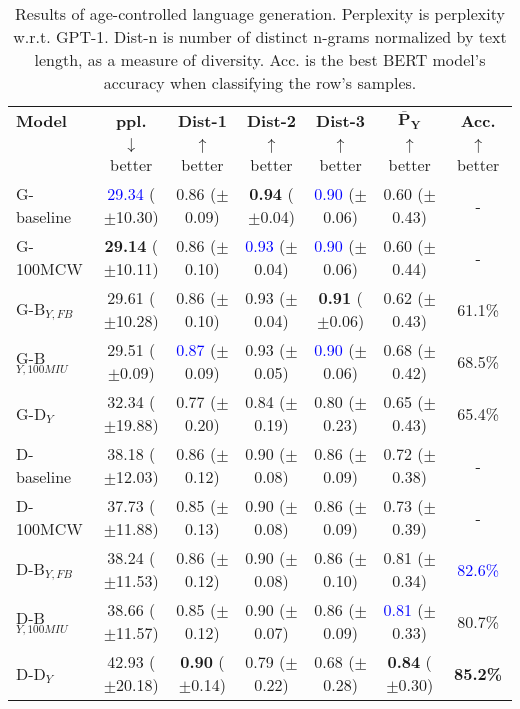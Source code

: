 \begin{table*}[h]
    \centering
    \begin{tabular}{l | c c c c | c c}
    \toprule
    \textbf{Model} & \textbf{ppl.} & \textbf{Dist-1} & \textbf{Dist-2} & \textbf{Dist-3} & $\boldsymbol{\bar{P}_Y}$ & \textbf{Acc.}\\
     & $\downarrow$ better & $\uparrow$ better & $\uparrow$ better & $\uparrow$ better & $\uparrow$ better & $\uparrow$ better\\
    \midrule
    \midrule
    G-baseline & \textcolor{blue}{29.34} ($\pm$10.30) & 0.86 ($\pm$0.09) & \textbf{0.94} ($\pm$0.04) & \textcolor{blue}{0.90} ($\pm$0.06) & 0.60 ($\pm$0.43) & -\\
    G-100MCW & \textbf{29.14} ($\pm$10.11) & 0.86 ($\pm$0.10) & \textcolor{blue}{0.93} ($\pm$0.04) & \textcolor{blue}{0.90} ($\pm$0.06) & 0.60 ($\pm$0.44) & -\\
    \midrule
    G-B$_{Y, FB}$ & 29.61 ($\pm$10.28) & 0.86 ($\pm$0.10) & 0.93 ($\pm$0.04) & \textbf{0.91} ($\pm$0.06) & 0.62 ($\pm$0.43) & 61.1\%\\
    G-B$_{Y, 100MIU}$ & 29.51 ($\pm$0.09) & \textcolor{blue}{0.87} ($\pm$0.09) & 0.93 ($\pm$0.05) & \textcolor{blue}{0.90} ($\pm$0.06) & 0.68 ($\pm$0.42) & 68.5\%\\
    \midrule
    G-D$_{Y}$ & 32.34 ($\pm$19.88) & 0.77 ($\pm$0.20) & 0.84 ($\pm$0.19) & 0.80 ($\pm$0.23) & 0.65 ($\pm$0.43) & 65.4\%\\
    \midrule
    \midrule
    D-baseline & 38.18 ($\pm$12.03) & 0.86 ($\pm$0.12) & 0.90 ($\pm$0.08) & 0.86 ($\pm$0.09) & 0.72 ($\pm$0.38) & -\\
    D-100MCW & 37.73 ($\pm$11.88) & 0.85 ($\pm$0.13) & 0.90 ($\pm$0.08) & 0.86 ($\pm$0.09) & 0.73 ($\pm$0.39) & -\\
    \midrule
    D-B$_{Y, FB}$ & 38.24 ($\pm$11.53) & 0.86 ($\pm$0.12) & 0.90 ($\pm$0.08) & 0.86 ($\pm$0.10) & 0.81 ($\pm$0.34) & \textcolor{blue}{82.6\%}\\
    D-B$_{Y, 100MIU}$ & 38.66 ($\pm$11.57) & 0.85 ($\pm$0.12) & 0.90 ($\pm$0.07) & 0.86 ($\pm$0.09) & \textcolor{blue}{0.81} ($\pm$0.33) & 80.7\%\\
    \midrule
    D-D$_{Y}$ & 42.93 ($\pm$20.18) & \textbf{0.90} ($\pm$0.14) & 0.79 ($\pm$0.22) & 0.68 ($\pm$0.28) & \textbf{0.84} ($\pm$0.30) & \textbf{85.2\%}\\
    \bottomrule
    \end{tabular}
    \caption{ Results of age-controlled language generation. Perplexity is perplexity w.r.t. GPT-1. Dist-n is number of distinct n-grams normalized by text length, as a measure of diversity. Acc. is the best BERT model's accuracy when classifying the row's samples.}
    \label{tab:ctg_results_ws_old_prompt_young_model}
\end{table*}

